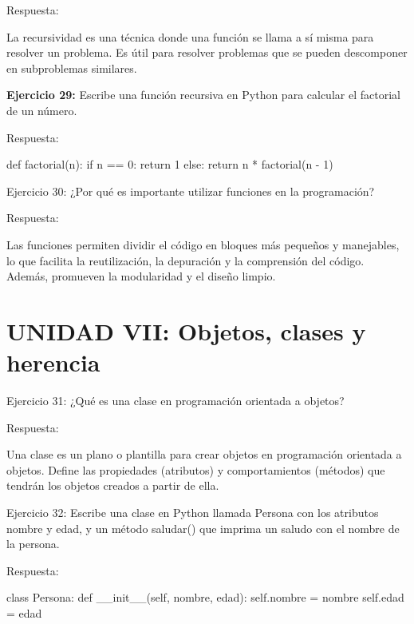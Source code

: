 \documentclass[
  a4paper,
  DIV=11,
  numbers=noendperiod,
  onepage,
  openany]{scrreprt}
\newenvironment{Shaded}{\begin{snugshade}}{\end{snugshade}}
\newcommand{\ControlFlowTok}[1]{\textcolor[rgb]{0.00,0.23,0.31}{#1}}
\newcommand{\DecValTok}[1]{\textcolor[rgb]{0.68,0.00,0.00}{#1}}
\newcommand{\FunctionTok}[1]{\textcolor[rgb]{0.28,0.35,0.67}{#1}}
\newcommand{\KeywordTok}[1]{\textcolor[rgb]{0.00,0.23,0.31}{#1}}
\newcommand{\NormalTok}[1]{\textcolor[rgb]{0.00,0.23,0.31}{#1}}
\newcommand{\OperatorTok}[1]{\textcolor[rgb]{0.37,0.37,0.37}{#1}}
\newcommand{\VariableTok}[1]{\textcolor[rgb]{0.07,0.07,0.07}{#1}}
\begin{document}
Respuesta:

La recursividad es una técnica donde una función se llama a sí misma
para resolver un problema. Es útil para resolver problemas que se pueden
descomponer en subproblemas similares.

\textbf{Ejercicio 29:} Escribe una función recursiva en Python para
calcular el factorial de un número.

Respuesta:

\begin{Shaded}
\begin{Highlighting}[]
\KeywordTok{def}\NormalTok{ factorial(n):}
    \ControlFlowTok{if}\NormalTok{ n }\OperatorTok{==} \DecValTok{0}\NormalTok{:}
        \ControlFlowTok{return} \DecValTok{1}
    \ControlFlowTok{else}\NormalTok{:}
        \ControlFlowTok{return}\NormalTok{ n }\OperatorTok{*}\NormalTok{ factorial(n }\OperatorTok{{-}} \DecValTok{1}\NormalTok{)}
\end{Highlighting}
\end{Shaded}

Ejercicio 30: ¿Por qué es importante utilizar funciones en la
programación?

Respuesta:

Las funciones permiten dividir el código en bloques más pequeños y
manejables, lo que facilita la reutilización, la depuración y la
comprensión del código. Además, promueven la modularidad y el diseño
limpio.

\section{UNIDAD VII: Objetos, clases y
herencia}\label{unidad-vii-objetos-clases-y-herencia}

Ejercicio 31: ¿Qué es una clase en programación orientada a objetos?

Respuesta:

Una clase es un plano o plantilla para crear objetos en programación
orientada a objetos. Define las propiedades (atributos) y
comportamientos (métodos) que tendrán los objetos creados a partir de
ella.

Ejercicio 32: Escribe una clase en Python llamada Persona con los
atributos nombre y edad, y un método saludar() que imprima un saludo con
el nombre de la persona.

Respuesta:

\begin{Shaded}
\begin{Highlighting}[]
\KeywordTok{class}\NormalTok{ Persona:}
    \KeywordTok{def} \FunctionTok{\_\_init\_\_}\NormalTok{(}\VariableTok{self}\NormalTok{, nombre, edad):}
        \VariableTok{self}\NormalTok{.nombre }\OperatorTok{=}\NormalTok{ nombre}
        \VariableTok{self}\NormalTok{.edad }\OperatorTok{=}\NormalTok{ edad}
\end{Highlighting}
\end{Shaded}
\end{document}
